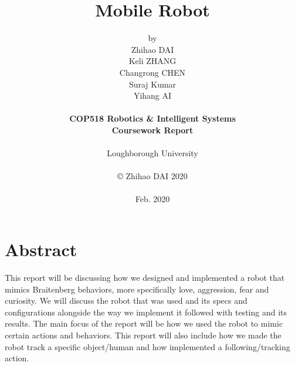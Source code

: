 \title{\bf Mobile Robot}

\author{by\\Zhihao DAI\\
Keli ZHANG\\
Changrong CHEN\\
Suraj Kumar\\
Yihang AI\\
\\
{\bf COP518 Robotics \& Intelligent Systems}\\
{\bf Coursework Report}\\
\\
Loughborough University\\
\\
\copyright
\hspace{1 dd} Zhihao DAI 2020\\
\\
Feb. 2020
}
\date{} %

\maketitle


% 
% 

\chapter*{Abstract}
This report will be discussing how we designed and implemented a robot that mimics Braitenberg behaviors, more specifically love, aggression, fear and curiosity. We will discuss the robot that was used and its specs and configurations alongside the way we implement it followed with testing and its results. The main focus of the report will be how we used the robot to mimic certain actions and behaviors. This report will also include how we made the robot track a specific object/human and how implemented a following/tracking action. 



